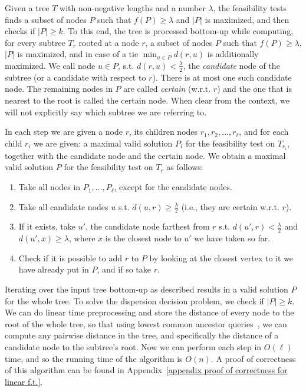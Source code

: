 \documentclass[a4paper,UKenglish]{lipics-v2016}
\theoremstyle{plain}
\begin{document}
Given a tree $T$ with non-negative lengths and a number $\lambda$, the feasibility tests finds a subset of nodes $P$ such that $f(P)\geq\lambda$
and $|P|$ is maximized, and then checks if $|P|\geq k$.
To this end, the tree is processed bottom-up while computing, for every subtree $T_{r}$ rooted at a node $r$, a subset of nodes $P$ such that
$f(P)\geq\lambda$, $|P|$ is maximized, and in case of a tie $\min_{u\in P}d(r,u)$ is additionally maximized.
We call node $u\in P$, s.t. $d(r,u)<\frac{\lambda}{2}$, the \emph{candidate} node of the subtree (or a candidate with respect to $r$). There is at most one such candidate node.
The remaining nodes in $P$ are called \emph{certain} (w.r.t. $r$) and the one that is nearest to the root is called the certain node.
When clear from the context, we will not explicitly say which subtree we are referring to.

In each step we are given a node $r$, its children nodes $r_{1},r_{2},\ldots,r_{\ell}$, and for each child $r_{i}$ we are given: a maximal valid
solution $P_{i}$ for the feasibility test on $T_{r_{i}}$, together with the candidate node and the certain node. We obtain a maximal valid solution $P$ for the feasibility test on $T_{r}$ as follows:
\begin{enumerate}
\item Take all nodes in $P_{1},\ldots,P_{\ell}$, except for the candidate nodes.
\item Take all candidate nodes $u$ s.t. $d(u,r) \geq \frac{\lambda}{2}$ (i.e., they are certain w.r.t. $r$).
\item If it exists, take $u'$, the candidate node farthest from $r$ s.t. $d(u',r) < \frac{\lambda}{2}$ and $d(u',x)\geq \lambda$, where $x$ is the closest node to $u'$ we have taken so far.\label{linear time step 3}
\item Check if it is possible to add $r$ to $P$ by looking at the closest vertex to it we have already put in $P$, and if so take $r$.
\end{enumerate}
Iterating over the input tree bottom-up as described results in a valid solution $P$ for the whole tree. To solve the dispersion decision problem,
we check if $|P|\geq k$. We can do linear time preprocessing and store the distance of every node to the root of the whole tree, so that using lowest common ancestor queries~\cite{Bender2000}, we can compute any pairwise distance in the tree, and specifically the distance of a candidate node to the subtree's root. Now we can perform each step in $O(\ell)$ time, and so the running time of the algorithm is $O(n)$. A proof of correctness of this algorithm can be found in Appendix~\ref{appendix proof of correctness for linear f.t.}.
\end{document}
